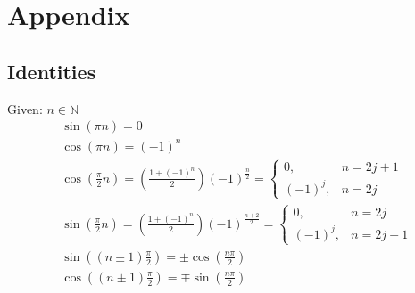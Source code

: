\section{Appendix}
\subsection{Identities}
Given: $n \in \mathbb{N}$
\begin{align*}
     & \sin(\pi n) = 0                                                                                                                       \\
     & \cos(\pi n) = {(-1)}^n                                                                                                                \\
     & \cos(\frac{\pi}{2}n)=\left(\frac{1+{(-1)}^n}{2}\right){(-1)}^{\frac{n}{2}}= \begin{cases} 0, &n=2j+1 \\ {(-1)}^j, &n=2j \end{cases}   \\
     & \sin(\frac{\pi}{2}n)=\left(\frac{1 + {(-1)}^n}{2}\right){(-1)}^{\frac{n+2}{2}}= \begin{cases} 0, &n=2j \\ {(-1)}^j,&n=2j+1 \end{cases} \\
     & \sin\left(\left(n\pm 1\right)\frac{\pi}{2}\right)=\pm \cos\left(\frac{n\pi}{2}\right)                                                 \\
     & \cos\left(\left(n\pm1\right)\frac{\pi}{2}\right)= \mp \sin\left(\frac{n\pi}{2}\right)                                                 \\
\end{align*}

